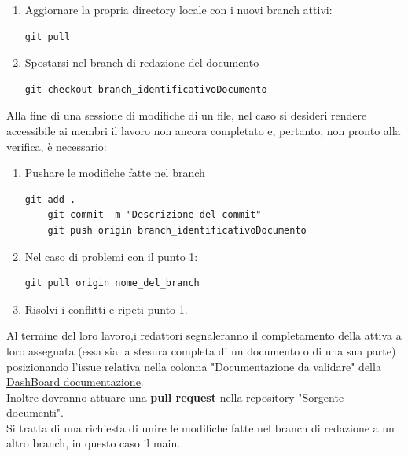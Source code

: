 \documentclass{article}
\begin{document}
    \begin{enumerate}
        \item Aggiornare la propria directory locale con i nuovi branch attivi:
        \begin{lstlisting}[style=code]
    git pull
        \end{lstlisting}

        \item Spostarsi nel branch di redazione del documento
        \begin{lstlisting}[style=code]
    git checkout branch_identificativoDocumento
        \end{lstlisting}
    \end{enumerate}
    Alla fine di una sessione di modifiche di un file, nel caso si desideri rendere accessibile ai membri il lavoro non ancora completato e, pertanto, non pronto alla verifica, è necessario:
    \begin{enumerate}
        \item Pushare le modifiche fatte nel branch 
        \begin{lstlisting}[style=code]
    git add .
    git commit -m "Descrizione del commit"
    git push origin branch_identificativoDocumento
        \end{lstlisting}

        \item Nel caso di problemi con il punto 1:
        \begin{lstlisting}[style=code]
   git pull origin nome_del_branch
        \end{lstlisting}
        \item Risolvi i conflitti e ripeti punto 1.
    \end{enumerate}
\vspace{0.3cm}
    Al termine del loro lavoro,i redattori segnaleranno il completamento della attiva a loro assegnata (essa sia la stesura completa di un documento o di una sua parte) posizionando l'issue relativa nella colonna "Documentazione da validare" della  \href{https://github.com/orgs/ByteOps-swe/projects/1/views/1}{DashBoard documentazione}.\\
    Inoltre dovranno attuare una \textbf{pull request} nella repository "Sorgente documenti".\\
    Si tratta di una richiesta di unire le modifiche fatte nel branch di redazione a un altro branch, in questo caso il main.
\end{document}
